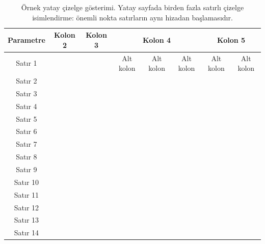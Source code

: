 \documentclass[a4paper, 12pt, oneside]{Etuthesis}
\begin{document}
{\begin{landscape}
\begin{table}[h]
\begin{tabular}{|c|c|c|c|c|c|c|c|}
\hline
Parametre & Kolon 2 & Kolon 3 & \multicolumn{3}{|c}{Kolon 4}       & \multicolumn{2}{|c|}{Kolon 5} \\ \hline
Satır 1   &         &         & Alt kolon & Alt kolon & Alt kolon & Alt kolon    & Alt kolon    \\ \hline
Satır 2   &         &         &           &           &           &              &              \\ \hline
Satır 3   &         &         &           &           &           &              &              \\ \hline
Satır 4   &         &         &           &           &           &              &              \\ \hline
Satır 5   &         &         &           &           &           &              &              \\ \hline
Satır 6   &         &         &           &           &           &              &              \\ \hline
Satır 7   &         &         &           &           &           &              &              \\ \hline
Satır 8   &         &         &           &           &           &              &              \\ \hline
Satır 9   &         &         &           &           &           &              &              \\ \hline
Satır 10  &         &         &           &           &           &              &              \\ \hline
Satır 11  &         &         &           &           &           &              &              \\ \hline
Satır 12  &         &         &           &           &           &              &              \\ \hline
Satır 13  &         &         &           &           &           &              &              \\ \hline
Satır 14  &         &         &           &           &           &              &              \\ \hline
\end{tabular}
\caption{Örnek yatay çizelge gösterimi. Yatay sayfada birden fazla satırlı çizelge isimlendirme: önemli nokta satırların  aynı hizadan başlamasıdır.}
\end{table}


\end{landscape}}
\end{document}
